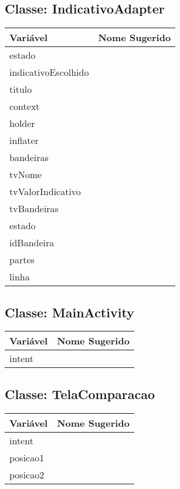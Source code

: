 \documentclass[12pt]{article}
\begin{document}
	\subsection{Classe: IndicativoAdapter}
		\begin{table}[H]
			\begin{center}
				\begin{tabular}{l | l}
					\toprule
						Variável & Nome Sugerido\\
					\midrule
						estado & \\
						indicativoEscolhido & \\
						titulo & \\
						context & \\
						holder & \\
						inflater & \\
						bandeiras & \\
						tvNome & \\
						tvValorIndicativo & \\
						tvBandeiras & \\
						estado & \\
						idBandeira & \\
						partes & \\
						linha & \\
					\bottomrule
				\end{tabular}
			\end{center}
		\end{table}

	\subsection{Classe: MainActivity}
		\begin{table}[H]
			\begin{center}
				\begin{tabular}{l | l}
					\toprule
						Variável & Nome Sugerido\\
					\midrule
						intent & \\
					\bottomrule
				\end{tabular}
			\end{center}
		\end{table}

	\subsection{Classe: TelaComparacao}
		\begin{table}[H]
			\begin{center}
				\begin{tabular}{l | l}
					\toprule
						Variável & Nome Sugerido\\
					\midrule
						intent & \\
						posicao1 & \\
						posicao2 & \\
					\bottomrule
				\end{tabular}
			\end{center}
		\end{table}
\end{document}
